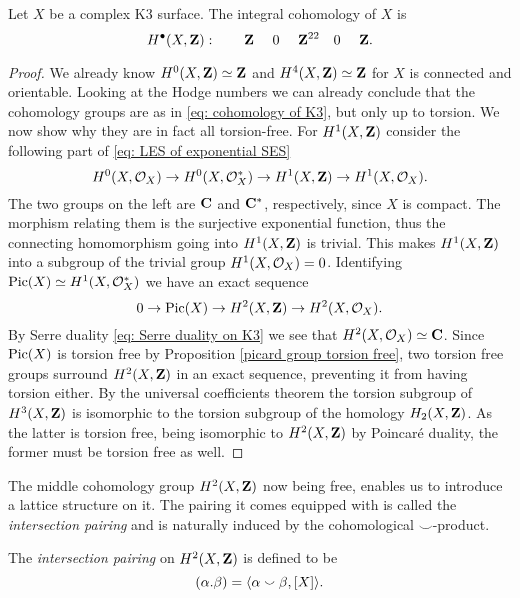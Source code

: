\begin{proposition}
    \label{cohomology of K3}
    \emph{\cite[\S 1.3.2]{Huybrechts2016}}
    Let $X$ be a complex K3 surface. The integral cohomology of $X$ is
    \begin{equation}
        \label{eq: cohomology of K3}
        H^{\bullet}(X, \mathbf Z): \qquad \mathbf Z \ \quad 0\ \quad \mathbf Z^{22} \quad 0\ \quad \mathbf Z.
    \end{equation}
\end{proposition}

\begin{proof}
    We already know $H^{0}(X, \mathbf Z) \simeq \mathbf Z$ and $H^{4}(X, \mathbf Z) \simeq \mathbf Z$ for $X$ is connected and orientable. Looking at the Hodge numbers
    we can already conclude that the cohomology groups are as in \eqref{eq: cohomology of K3}, but only up to torsion. 
    We now show why they are in fact all torsion-free. For $H^{1}(X, \mathbf Z)$ consider the following part of \eqref{eq: LES of exponential SES} 
    \[
        H^{0}(X, {\mathcal{O}_{X}}) \to H^{0}(X, \mathcal O_X^*) \to H^{1}(X, \mathbf Z) \to H^{1}(X, {\mathcal{O}_{X}}).
    \]
    The two groups on the left are $\mathbf C$ and $\mathbf C^*$, respectively, since $X$ is compact. The morphism relating them is the surjective exponential function, thus the connecting homomorphism going into $H^{1}(X, \mathbf Z)$ is trivial. This makes $H^{1}(X, \mathbf Z)$ into a subgroup of the trivial group $H^{1}(X, {\mathcal{O}_{X}}) = 0$.
    Identifying $\operatorname{Pic}(X) \simeq H^{1}(X, \mathcal O_X^*)$ we have an exact sequence
    \[
        0 \to \operatorname{Pic}(X) \to H^{2}(X, \mathbf Z) \to H^{2}(X, {\mathcal{O}_{X}}).
    \]
    By Serre duality \eqref{eq: Serre duality on K3} we see that $H^{2}(X, {\mathcal{O}_{X}}) \simeq \mathbf C$. 
    Since $\operatorname{Pic}(X)$ is torsion free by Proposition \ref{picard group torsion free}, two torsion free groups surround $H^{2}(X, \mathbf Z)$ in an exact sequence, preventing it from having torsion either.
    By the universal coefficients theorem the torsion subgroup of $H^{3}(X, \mathbf Z)$ is isomorphic to the torsion subgroup of the homology $H_2(X,\mathbf Z)$. As the latter is torsion free, being isomorphic to $H^{2}(X, \mathbf Z)$ by Poincaré duality, the former must be torsion free as well. 
\end{proof}

The middle cohomology group $H^{2}(X, \mathbf Z)$ now being free, enables us to introduce a lattice structure on it. The pairing it comes equipped with is called the \emph{intersection pairing} and is naturally induced by the cohomological $\smallsmile$-product. 
\begin{definition}
    The \emph{intersection pairing} on $H^{2}(X, \mathbf Z)$ is defined to be 
    \[
        (\alpha.\beta) = \langle \alpha \smallsmile \beta, [X] \rangle.
    \] 
\end{definition}

